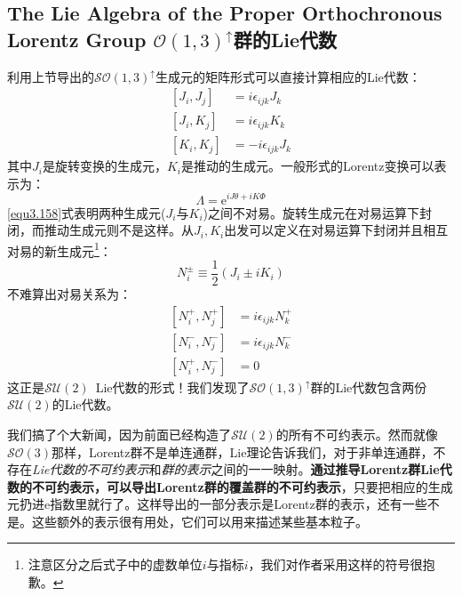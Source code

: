 \subsection[$\mathcal{SO}(1, 3)^\uparrow$群的Lie代数]{The Lie Algebra of the Proper Orthochronous Lorentz Group \quad $\mathcal{O}(1, 3)^\uparrow$群的Lie代数}
\label{equ3.7.3}
利用上节导出的$\mathcal{SO}(1, 3)^\uparrow$生成元的矩阵形式可以直接计算相应的Lie代数：
\begin{align}
\label{equ3.157}
	[J_i, J_j] &= i \epsilon_{ijk} J_k \\
\label{equ3.158}
	[J_i, K_j] &= i \epsilon_{ijk} K_k \\
\label{equ3.159}
	[K_i, K_j] &= -i \epsilon_{ijk} J_k
\end{align}
其中$J_i$是旋转变换的生成元，$K_i$是推动的生成元。一般形式的Lorentz变换可以表示为：
\begin{equation}
\label{equ3.160}
	\Lambda = \mathrm{e}^{i J \theta + i K \Phi}
\end{equation}
\eqref{equ3.158}式表明两种生成元($J_i$与$K_i$)之间不对易。旋转生成元在对易运算下封闭，而推动生成元则不是这样。从$J_i, K_i$出发可以定义在对易运算下封闭并且相互对易的新生成元\footnote{注意区分之后式子中的虚数单位$i$与指标$i$，我们对作者采用这样的符号很抱歉。}：
\begin{equation}
\label{equ3.161}
	N_i^\pm \equiv \frac{1}{2} (J_i \pm i K_i)
\end{equation}
不难算出对易关系为：
\begin{align}
\label{equ3.162}
	[N_i^+, N_j^+] &= i \epsilon_{ijk} N_k^+ \\
\label{equ3.163}
	[N_i^-, N_j^-] &= i \epsilon_{ijk} N_k^- \\
\label{equ3.164}
	[N_i^+, N_j^-] &= 0
\end{align}
这正是$\mathcal{SU}(2)$\, Lie代数的形式！我们发现了$\mathcal{SO}(1, 3)^\uparrow$群的Lie代数包含两份$\mathcal{SU}(2)$的Lie代数。

我们搞了个大新闻，因为前面已经构造了$\mathcal{SU}(2)$的所有不可约表示。然而就像$\mathcal{SO}(3)$那样，Lorentz群不是单连通群，Lie理论告诉我们，对于非单连通群，不存在{\itshape Lie代数的不可约表示}和{\itshape 群的表示}之间的一一映射。{\bfseries 通过推导Lorentz群Lie代数的不可约表示，可以导出Lorentz群的覆盖群的不可约表示}，只要把相应的生成元扔进$\mathrm{e}$指数里就行了。这样导出的一部分表示是Lorentz群的表示，还有一些不是。这些额外的表示很有用处，它们可以用来描述某些基本粒子。

